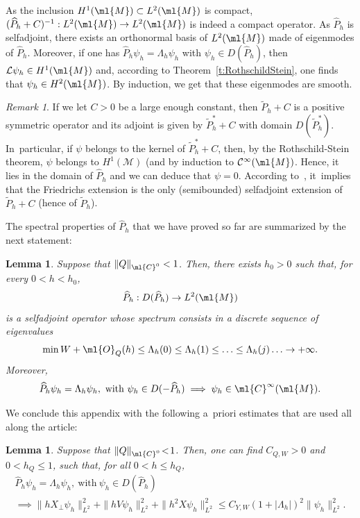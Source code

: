 \documentclass[10pt]{amsart}
\theoremstyle{plain}
\newtheorem{lemm}[theo]{Lemma}
\theoremstyle{definition}
\theoremstyle{remark}
\newtheorem{rema}[theo]{Remark}
\begin{document}
As the inclusion $H^1(\ml{M})\subset L^2(\ml{M})$ is compact, $(\widehat{P}_h+C)^{-1}:L^2(\ml{M})\to L^2(\ml{M})$ is indeed a compact operator. As $\widehat{P}_h$ is selfadjoint, there exists an orthonormal basis of $L^2(\ml{M})$ made of eigenmodes of $\widehat{P}_h$. Moreover, if one has $\widehat{P}_h\psi_h=\Lambda_h\psi_h$ with $\psi_h\in D(\widehat{P}_h)$, then $\mathcal{L}\psi_h\in H^1(\ml{M})$ and, according to Theorem~\ref{t:RothschildStein}, one finds that $\psi_h\in H^2(\ml{M})$. By induction, we get that these eigenmodes are smooth.

\begin{rema} If we let $C>0$ be a large enough constant, then $\tilde{P}_h+C$ is a positive symmetric operator and its adjoint is given by $\tilde{P}_h^*+C$ with domain $D(\tilde{P}_h^*)$. In~particular, if $\psi$ belongs to the kernel of $\tilde{P}_h^*+C$, then, by the Rothschild-Stein theorem, $\psi$ belongs to $H^1(\mathcal{M})$ (and by induction to $\mathcal{C}^{\infty}(\ml{M})$. Hence, it lies in the domain of $\widehat{P}_h$ and we can deduce that $\psi=0$. According to~\cite[Th.\,X.26]{ReedSimon75}, it~implies that the Friedrichs extension is the only (semibounded) selfadjoint extension of $\tilde{P}_h+C$ (hence of $\tilde{P}_h$).
\end{rema}

The spectral properties of $\widehat{P}_h$ that we have proved so far are summarized by the next statement:

\begin{lemm}\label{l:spectrum} Suppose that $\|Q\|_{\ml{C}^0}<1$. Then, there exists $h_0>0$ such that, for every $0<h<h_0$,
\[
\widehat{P}_h:D(\widehat{P}_h)\to L^2(\ml{M})
\]
is a selfadjoint operator whose spectrum consists in a discrete sequence of eigenvalues
\[
\min W+\ml{O}_Q(h)\leq \Lambda_h(0)\leq\Lambda_h(1)\leq\ldots\leq \Lambda_h(j)\ldots\to +\infty.
\]
Moreover,
\[
\widehat{P}_h\psi_h=\Lambda_h\psi_h,\ \text{with}\ \psi_h\in D(-\widehat{P}_h)\implies \psi_h\in \ml{C}^\infty(\ml{M}).
\]
\end{lemm}

We conclude this appendix with the following a~priori estimates that are used all along the article:

\begin{lemm}\label{l:apriori-estimate} Suppose that $\|Q\|_{\ml{C}^0}\!<\!1$. Then, one can find $C_{Q,W}\!>\!0$ and $0\!<\!h_Q\!\leq\! 1$, such that, for all $0<h\leq h_Q$,
\begin{multline*}
\widehat{P}_h\psi_h=\Lambda_h\psi_h,\ \text{with}\ \psi_h\in D(\widehat{P}_h)\\
\implies \|hX_\perp\psi_h\|_{L^2}^2+\|hV\psi_h\|_{L^2}^2+\|h^2X\psi_h\|_{L^2}^2\leq C_{Y,W}(1+|\Lambda_h|)^2\|\psi_h\|_{L^2}^2.
\end{multline*}
\end{lemm}
\end{document}
